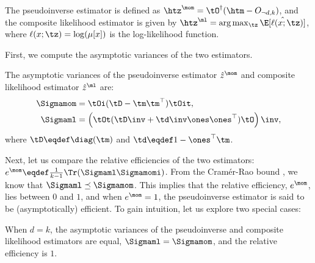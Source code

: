 The pseudoinverse estimator is defined as $\htz^\mom = \tO^\dagger (\htm - O_{\neg d, k})$, and the composite likelihood estimator is given by $\htz^\ml = \arg\max_{\tz} \hat\E[\ell(x; \tz)]$,
where $\ell(x; \tz) = \log(\mu[x])$ is the log-likelihood function.


First, we compute the asymptotic variances of the two estimators.
\begin{lemma}
  \label{lem:mom-pw-variance}
  The asymptotic variances of the pseudoinverse estimator $\hat z^\mom$
  and composite likelihood estimator $\hat z^\ml$ are:
  \begin{align*}
    \Sigmamom 
      &= \tOi (\tD - \tm \tm^\top) \tOit, \\
    \Sigmaml 
      &=
      \left( \tOt (\tD\inv + \td\inv \ones\ones^\top) \tO \right)\inv,
  \end{align*}
  where $\tD \eqdef \diag(\tm)$ and $\td \eqdef 1 - \ones^\top\tm$.
\end{lemma}

Next, let us compare the relative efficiencies of the two estimators:
$e^\mom \eqdef \frac{1}{k-1} \Tr(\Sigmaml
\Sigmamomi)$. 
From the Cram\'{e}r-Rao bound \cite{vaart98asymptotic}, we know that
$\Sigmaml \preceq \Sigmamom$. This implies that the relative efficiency,
$e^\mom$, lies between $0$ and $1$, and when $e^\mom = 1$, the
pseudoinverse estimator is said to be (asymptotically) efficient.  
To gain intuition, let us explore two special cases:

\begin{lemma}[Relative efficiency when $d = k$]
  When $d = k$, the asymptotic variances of the pseudoinverse and
  composite likelihood estimators are equal, $\Sigmaml = \Sigmamom$, and the relative efficiency is $1$.
\end{lemma}

